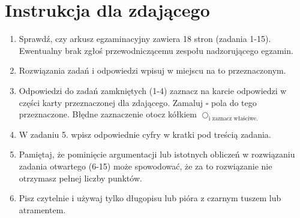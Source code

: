 \documentclass[10pt]{article}
\begin{document}
\section*{Instrukcja dla zdającego}
\begin{enumerate}
  \item Sprawdź, czy arkusz egzaminacyjny zawiera 18 stron (zadania 1-15). Ewentualny brak zgłoś przewodniczącemu zespołu nadzorującego egzamin.
  \item Rozwiązania zadań i odpowiedzi wpisuj w miejscu na to przeznaczonym.
  \item Odpowiedzi do zadań zamkniętych (1-4) zaznacz na karcie odpowiedzi w części karty przeznaczonej dla zdającego. Zamaluj \(\square\) pola do tego przeznaczone. Błędne zaznaczenie otocz kółkiem \(\bigcirc_{\text {i zaznacz właściwe. }}\)
  \item W zadaniu 5. wpisz odpowiednie cyfry w kratki pod treścią zadania.
  \item Pamiętaj, że pominięcie argumentacji lub istotnych obliczeń w rozwiązaniu zadania otwartego (6-15) może spowodować, że za to rozwiązanie nie otrzymasz pełnej liczby punktów.
  \item Pisz czytelnie i używaj tylko długopisu lub pióra z czarnym tuszem lub atramentem.\\

\end{enumerate}
\end{document}
